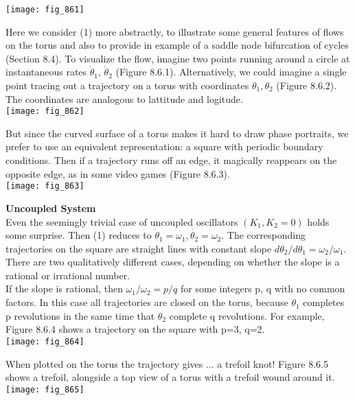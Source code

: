 \documentclass{article}
\newcommand\tab[1][1cm]{\hspace*{#1}}
\begin{document}
\texttt{[image: fig\_861]}

Here we consider (1) more abstractly, to illustrate some general features of flows on the torus and also to provide in example of a saddle node bifurcation of cycles (Section 8.4). To visualize the flow, imagine two points running around a circle at instantaneous rates $\dot{\theta}_{1}$, ${\dot{\theta}_{2}}$ (Figure 8.6.1). Alternatively, we could imagine a single point tracing out a trajectory on a torus with coordinates $\theta_{1}, \theta_{2}$ (Figure 8.6.2). The coordinates are analogous to lattitude and logitude. \\ 
\texttt{[image: fig\_862]}

But since the curved surface of a torus makes it hard to draw phase portraits, we prefer to use an equivalent representation: a square with periodic boundary conditions. Then if a trajectory runs off an edge, it magically reappears on the opposite edge, as in some video games (Figure 8.6.3). \\

\texttt{[image: fig\_863]}

\textbf {Uncoupled System} \\ \tab
Even the seemingly trivial case of uncoupled oscillators $(K_{1}, K_{2}=0)$ holds some surprise. Then (1) reduces to $\dot{\theta}_{1}=\omega_{1}, \dot{\theta_{2}}=\omega_{2}$. The corresponding trajectories on the square are straight lines with constant slope $d\theta_{2}/d\theta_{1}=\omega_{2}/\omega_{1}$. There are two qualitatively different cases, depending on whether the slope is a rational or irrational number. \\ \tab
If the slope is rational, then $\omega_{1}/\omega_{2}=p/q$ for some integers p, q with no common factors. In this case all trajectories are closed on the torus, because $\theta_{1}$ completes p revolutions in the same time that $\theta_{2}$ complete q revolutions. For example, Figure 8.6.4 shows a trajectory on the square with p=3, q=2. \\

\texttt{[image: fig\_864]}

When plotted on the torus the trajectory gives ... a trefoil knot! Figure 8.6.5 shows a trefoil, alongside a top view of a torus with a trefoil wound around it. 
\\

\texttt{[image: fig\_865]}
\end{document}
